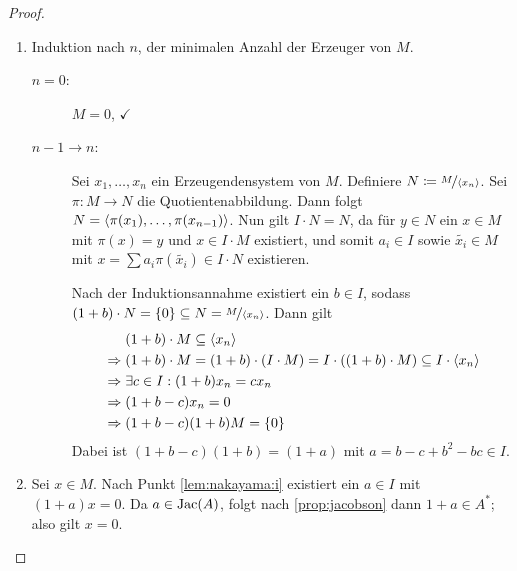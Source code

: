 \documentclass[12pt,a4paper]{scrartcl}
\theoremstyle{cplain}
\theoremstyle{cdef}
\begin{document}
\begin{proof}
	\leavevmode
	\begin{enumerate}
		\item Induktion nach $n$, der minimalen Anzahl der Erzeuger von $M$.
        \begin{description}
            \item[$n = 0$:] $M = 0$, $\checkmark$
            \item[$n-1\to n$:] Sei $x_1,\dots, x_n$ ein Erzeugendensystem von $M$. Definiere $N\coloneqq \nicefrac{M}{\langle x_n\rangle}$. Sei $\pi \colon M\to N$ die Quotientenabbildung. Dann folgt $N = \langle\pi(x_1),\dots,\pi(x_{n-1})\rangle$. Nun gilt $I\cdot N = N$, da für $y\in N$ ein $x\in M$ mit $\pi(x) = y$ und $x\in I\cdot M$ existiert, und somit $a_i\in I$ sowie $\tilde{x_i}\in M$ mit $x =\sum a_i\pi(\tilde{x_i})\in I\cdot N$ existieren.
		
            Nach der Induktionsannahme existiert ein $b\in I$, sodass $(1+b)\cdot N = \{0\}\subseteq N = \nicefrac{M}{\langle x_n\rangle}$. Dann gilt
            \begin{align*}
                &\phantom{{}\Rightarrow{}}(1+b)\cdot M\subseteq \<x_n\>\\
                &\Rightarrow (1+b)\cdot M = (1+b)\cdot (I\cdot M) = I\cdot((1+b)\cdot M)\subseteq I \cdot \<x_n\>\\
                &\Rightarrow \exists c\in I: (1+b) x_n = cx_n \\
                &\Rightarrow (1+b-c)x_n = 0\\
                &\Rightarrow (1+b-c)(1+b)M = \{0\}
            \end{align*}
            Dabei ist $(1+b-c)(1+b) = (1+a)$ mit $a = b-c+b^2-bc\in I$.
        \end{description}
        \item Sei $x\in M$. Nach Punkt \ref{lem:nakayama:i} existiert ein $a\in I$ mit $(1+a)x = 0$. Da $a\in \operatorname{Jac}(A)$, folgt nach \cref{prop:jacobson} dann $1+a\in A^{*}$; also gilt $x = 0$.
        \qedhere
	\end{enumerate}
\end{proof}

\end{document}
